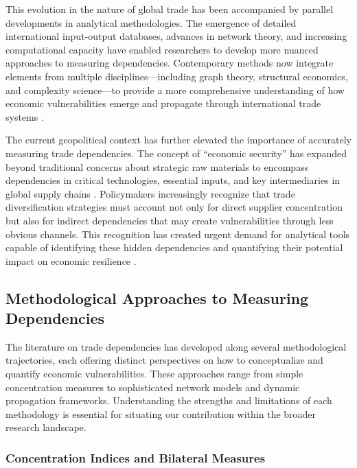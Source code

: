 \documentclass[final,1p,times,authoryear]{elsarticle}
\begin{document}
This evolution in the nature of global trade has been accompanied by parallel developments in analytical methodologies. The emergence of detailed international input-output databases, advances in network theory, and increasing computational capacity have enabled researchers to develop more nuanced approaches to measuring dependencies. Contemporary methods now integrate elements from multiple disciplines—including graph theory, structural economics, and complexity science—to provide a more comprehensive understanding of how economic vulnerabilities emerge and propagate through international trade systems \citep{Cerina2015, Acemoglu2012}.

The current geopolitical context has further elevated the importance of accurately measuring trade dependencies. The concept of ``economic security'' has expanded beyond traditional concerns about strategic raw materials to encompass dependencies in critical technologies, essential inputs, and key intermediaries in global supply chains \citep{farrell2019weaponized, EuropeanCommission2021}. Policymakers increasingly recognize that trade diversification strategies must account not only for direct supplier concentration but also for indirect dependencies that may create vulnerabilities through less obvious channels. This recognition has created urgent demand for analytical tools capable of identifying these hidden dependencies and quantifying their potential impact on economic resilience \citep{Arriola2024, FernandezVillaverde2024}.

\subsection{Methodological Approaches to Measuring Dependencies}

The literature on trade dependencies has developed along several methodological trajectories, each offering distinct perspectives on how to conceptualize and quantify economic vulnerabilities. These approaches range from simple concentration measures to sophisticated network models and dynamic propagation frameworks. Understanding the strengths and limitations of each methodology is essential for situating our contribution within the broader research landscape.

\subsubsection{Concentration Indices and Bilateral Measures}
\end{document}

